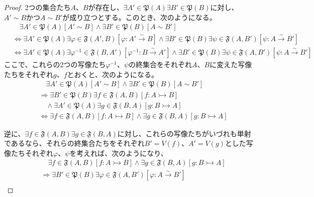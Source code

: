 \documentclass[dvipdfmx]{jsarticle}
\begin{document}
\begin{proof}
2つの集合たち$A$、$B$が存在し、$\exists A'\in \mathfrak{P}(A)\exists B'\in \mathfrak{P}(B)$に対し、$A' \sim B$かつ$A \sim B'$が成り立つとする。このとき、次のようになる。
\begin{align*}
&\quad \exists A'\in \mathfrak{P}(A)\left[ A' \sim B \right] \land \exists B'\in \mathfrak{P}(B)\left[ A \sim B' \right]\\
&\Leftrightarrow \exists A'\in \mathfrak{P}(A)\exists\varphi\in \mathfrak{F}\left( A',B \right)\left[ \varphi:A'\overset{\sim}{\rightarrow}B \right] \land \exists B'\in \mathfrak{P}(B)\exists\psi \in \mathfrak{F}\left( A,B' \right)\left[ \psi:A\overset{\sim}{\rightarrow}B' \right]\\
&\Leftrightarrow \exists A'\in \mathfrak{P}(A)\exists\varphi^{- 1}\in \mathfrak{F}\left( B,A' \right)\left[ \varphi^{- 1}:B\overset{\sim}{\rightarrow}A' \right] \land \exists B'\in \mathfrak{P}(B)\exists\psi \in \mathfrak{F}\left( A,B' \right)\left[ \psi:A\overset{\sim}{\rightarrow}B' \right]
\end{align*}
ここで、これらの2つの写像たち$\varphi^{- 1}$、$\psi$の終集合をそれぞれ$A$、$B$に変えた写像たちをそれぞれ$g$、$f$とおくと、次のようになる。
\begin{align*}
&\quad \exists A'\in \mathfrak{P}(A)\left[ A' \sim B \right] \land \exists B'\in \mathfrak{P}(B)\left[ A \sim B' \right]\\
&\Rightarrow \exists B'\in \mathfrak{P}(B)\exists f \in \mathfrak{F}(A,B)[ f:A \rightarrowtail B] \\
&\quad \land \exists A'\in \mathfrak{P}(A)\exists g \in \mathfrak{F}(B,A)[ g:B \rightarrowtail A]\\
&\Leftrightarrow \exists f \in \mathfrak{F}(A,B)[ f:A \rightarrowtail B] \land \exists g \in \mathfrak{F}(B,A)[ g:B \rightarrowtail A]
\end{align*}\par
逆に、$\exists f \in \mathfrak{F}(A,B)\exists g \in \mathfrak{F}(B,A)$に対し、これらの写像たちがいづれも単射であるなら、それらの終集合たちをそれぞれ$B' = V(f)$、$A' = V(g)$とした写像たちそれぞれ$\varphi$、$\psi$を考えれば、次のようになり、
\begin{align*}
&\quad \exists f \in \mathfrak{F}(A,B)[ f:A \rightarrowtail B] \land \exists g \in \mathfrak{F}(B,A)[ g:B \rightarrowtail A]\\
&\Rightarrow \exists B'\in \mathfrak{P}(B)\exists\varphi \in \mathfrak{F}\left( A,B' \right)\left[ \varphi:A\overset{\sim}{\rightarrow}B' \right] \\

\end{align*}
\end{proof}
\end{document}
